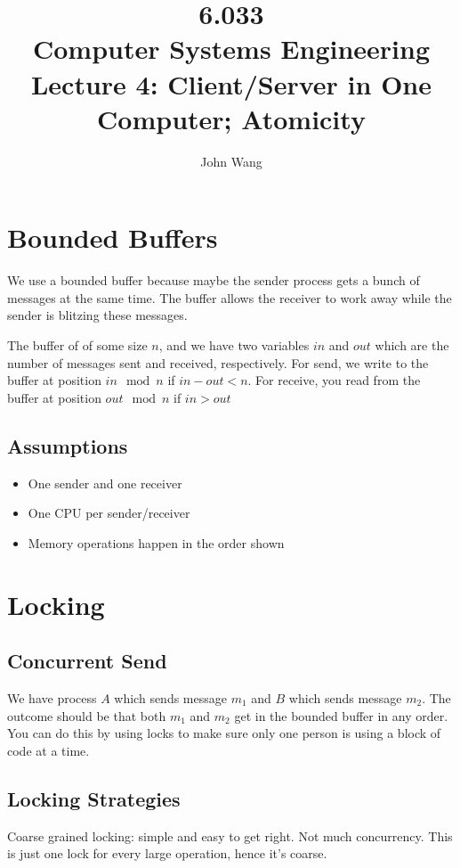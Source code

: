 \documentclass[psamsfonts]{amsart}
\title{6.033 \\
Computer Systems Engineering \\
Lecture 4: Client/Server in One Computer; Atomicity}
\author{John Wang}
\begin{document}
\maketitle

\section{Bounded Buffers}

We use a bounded buffer because maybe the sender process gets a bunch of messages at the same time. The buffer allows the receiver to work away while the sender is blitzing these messages.

The buffer of of some size $n$, and we have two variables $in$ and $out$ which are the number of messages sent and received, respectively. For send, we write to the buffer at position $in \mod n$ if $in - out < n$. For receive, you read from the buffer at position $out \mod n$ if $in > out$ 

\subsection{Assumptions}
\begin{itemize}
  \item One sender and one receiver
  \item One CPU per sender/receiver
  \item Memory operations happen in the order shown
\end{itemize}

\section{Locking}

\subsection{Concurrent Send}

We have process $A$ which sends message $m_1$ and $B$ which sends message $m_2$. The outcome should be that both $m_1$ and $m_2$ get in the bounded buffer in any order. You can do this by using locks to make sure only one person is using a block of code at a time.

\subsection{Locking Strategies}

Coarse grained locking: simple and easy to get right. Not much concurrency. This is just one lock for every large operation, hence it's coarse.
\end{document}
